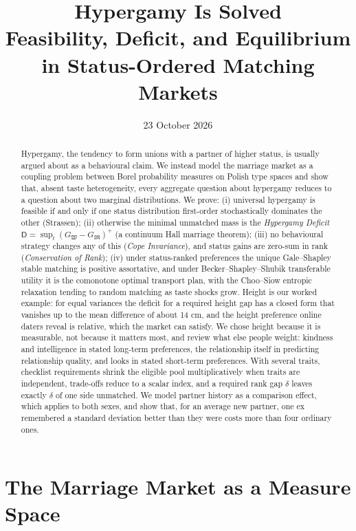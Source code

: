 \documentclass[11pt]{article}
\title{
  \textbf{Hypergamy Is Solved}\\[0.2em]
  \large Feasibility, Deficit, and Equilibrium in Status-Ordered
  Matching Markets
}
\author{}
\date{23 October 2026}
\let\oldsection\section
\renewcommand{\section}{\Needspace{0.25\textheight}\oldsection}
\theoremstyle{definition}
\theoremstyle{remark}
\newcommand{\M}{\mathfrak{M}}
\newcommand{\W}{\mathfrak{W}}
\newcommand{\D}{\mathsf{D}}
\begin{document}
\maketitle

\begin{abstract}
  Hypergamy, the tendency to form unions with a partner of higher
  status, is usually argued about as a behavioural claim. We instead
  model the marriage market as a coupling problem between Borel
  probability measures on Polish type spaces and show that, absent
  taste heterogeneity, every aggregate question about hypergamy
  reduces to a question about two marginal distributions. We prove:
  (i) universal hypergamy is feasible if and only if one status
  distribution first-order stochastically dominates the other
  (Strassen); (ii) otherwise the minimal unmatched mass is the
  \emph{Hypergamy Deficit} $\D = \sup_t(G_\W - G_\M)^+$ (a continuum
  Hall marriage theorem); (iii) no behavioural strategy changes any of
  this (\emph{Cope Invariance}), and status gains are zero-sum in rank
  (\emph{Conservation of Rank}); (iv) under status-ranked preferences
  the unique Gale--Shapley stable matching is positive assortative,
  and under Becker--Shapley--Shubik transferable utility it is the
  comonotone optimal transport plan, with the Choo--Siow entropic
  relaxation tending to random matching as taste shocks grow. Height is
  our worked example: for equal variances the deficit for a required
  height gap has a closed form that vanishes up to the mean difference
  of about 14 cm, and the height preference online daters reveal is
  relative, which the market can satisfy. We chose height because it is
  measurable, not because it matters most, and review what else people
  weight: kindness and intelligence in stated long-term preferences, the
  relationship itself in predicting relationship quality, and looks in
  stated short-term preferences. With several traits, checklist
  requirements shrink the eligible pool multiplicatively when traits are
  independent, trade-offs reduce to a scalar index, and a required rank
  gap $\delta$ leaves exactly $\delta$ of one side unmatched. We model
  partner history as a comparison effect, which applies to both sexes,
  and show that, for an average new partner, one ex remembered a standard
  deviation better than they were costs more than four ordinary ones.
\end{abstract}

\section{The Marriage Market as a Measure Space}
\end{document}
